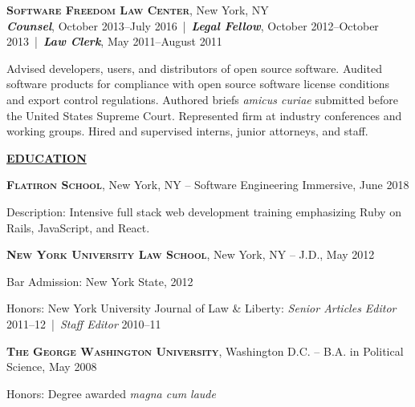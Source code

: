 \documentclass[11pt,letterpaper,english]{article}
\newenvironment{resumelist}[1]
{\begin{list}{}
{\setlength\itemsep{0pt}
\setlength\topsep{0pt}
\setlength\parskip{0pt}
\setlength\parsep{0pt}
\settowidth{\labelwidth}{#1}
 \setlength{\leftmargin}{\labelwidth}
 \addtolength{\leftmargin}{\labelsep}
 \renewcommand{\makelabel}[1]{##1\hfil}}}
{\end{list}}
\begin{document}
\textbf{\textsc{Software Freedom Law Center}}, New York, NY\\\nopagebreak
\textbf{\textit{Counsel}}, October 2013--July 2016\ |\ \textbf{\textit{Legal Fellow}}, October 2012--October 2013\ |\ \textbf{\textit{Law Clerk}}, May 2011--August 2011
\begin{resumelist}{M}
\item Advised developers, users, and distributors of open source software. Audited software products for compliance with open source software license conditions and export control regulations. Authored briefs \textit{amicus curiae} submitted before the United States Supreme Court. Represented firm at industry conferences and working groups. Hired and supervised interns, junior attorneys, and staff.
\end{resumelist}
\bigskip

\label{Education}
\underline{\textbf{\textsc{\large EDUCATION}}}{\large \par}
\smallskip

\textbf{\textsc{Flatiron School}}, New York, NY -- Software Engineering Immersive, June 2018
\begin{resumelist}{MMMMMMM}
\item [{Description:}] Intensive full stack web development training emphasizing Ruby on Rails, JavaScript, and React.
\end{resumelist}
\smallskip

\textbf{\textsc{New York University Law School}}, New York, NY -- J.D., May 2012
\begin{resumelist}{MMMMMMM}
\item [{Bar Admission:}] New York State, 2012
\item [{Honors:}] New York University Journal of Law \& Liberty: \textit{Senior Articles Editor} 2011--12~|~\textit{Staff Editor} 2010--11
\end{resumelist}
\smallskip

\textbf{\textsc{The George Washington University}}, Washington D.C. -- B.A. in Political Science, May 2008
\begin{resumelist}{MMMMMMM}
\item [{Honors:}] Degree awarded \textit{magna cum laude}
\end{resumelist}
\end{document}

